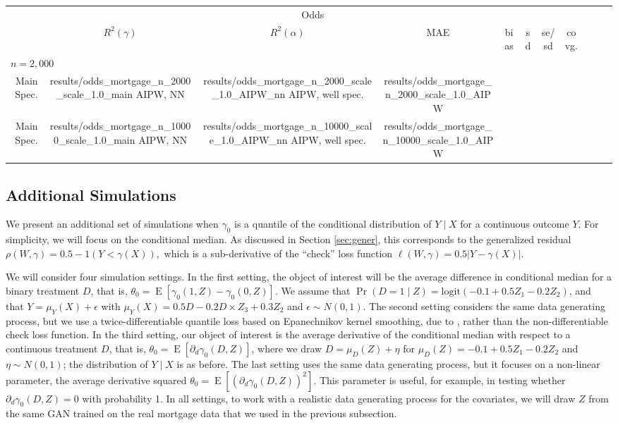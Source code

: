 \documentclass[aos]{imsart}
\makeatletter
\numberwithin{equation}{section}
\theoremstyle{plain}
\theoremstyle{remark}
\DeclareMathOperator{\E}{E}
\newcommand\tableinput[1]{\@@input #1 }
\makeatother
\begin{document}
\begin{table}[]
\begin{tabular}{r*{7}{c}}
    \addlinespace
    \midrule
    & \multicolumn{7}{c}{Odds} \\
    \cmidrule(r){2-8}
    & $R^2(\gamma)$ & $R^2(\alpha)$ & MAE & bias & sd & se/sd & covg. \\ 
    \midrule
    \multicolumn{8}{l}{$n = 2,000$} \\
    Main Spec. & \tableinput{results/odds_mortgage_n_2000_scale_1.0_main}
    AIPW, NN & \tableinput{results/odds_mortgage_n_2000_scale_1.0_AIPW_nn}
    AIPW, well spec. &\tableinput{results/odds_mortgage_n_2000_scale_1.0_AIPW}
    \addlinespace
    \multicolumn{8}{l}{$n = 10,000$} \\
    Main Spec. & \tableinput{results/odds_mortgage_n_10000_scale_1.0_main}
    AIPW, NN & \tableinput{results/odds_mortgage_n_10000_scale_1.0_AIPW_nn}
    AIPW, well spec. &\tableinput{results/odds_mortgage_n_10000_scale_1.0_AIPW}
    \bottomrule
    \end{tabular}
\end{table}

\subsection{Additional Simulations} We present an additional set of simulations when $\gamma_0$ is a quantile of the conditional distribution of $Y \mid X$ for a continuous outcome $Y$. For simplicity, we will focus on the conditional median. As discussed in Section \ref{sec:gener}, this corresponds to the generalized residual $\rho(W, \gamma) = 0.5 - 1(Y < \gamma(X)),$ which is a sub-derivative of the ``check'' loss function $\ell(W, \gamma) = 0.5|Y - \gamma(X)|$.

We will consider four simulation settings. In the first setting, the object of interest will be the average difference in conditional median for a binary treatment $D$, that is, $\theta_0 = \E[\gamma_0(1, Z) - \gamma_0(0, Z)]$. We assume that $\Pr(D = 1 \mid Z) = \mathrm{logit}(-0.1 + 0.5 Z_1 - 0.2 Z_2)$, and that $Y = \mu_Y(X) + \epsilon$ with $\mu_Y(X) = 0.5D - 0.2 D \times Z_3 + 0.3 Z_2$ and $\epsilon \sim N(0, 1)$.  The second setting considers the same data generating process, but we use a twice-differentiable quantile loss based on Epanechnikov kernel smoothing, due to \cite{he2023smoothed}, rather than the non-differentiable check loss function. In the third setting, our object of interest is the average derivative of the conditional median with respect to a continuous treatment $D$, that is, $\theta_0 = \E[\partial_d \gamma_0(D, Z)]$, where we draw $D = \mu_D(Z) + \eta$ for $\mu_D(Z) = -0.1 + 0.5 Z_1 - 0.2 Z_2$ and $\eta \sim N(0, 1)$; the distribution of $Y \mid X$ is as before. The last setting uses the same data generating process, but it focuses on a non-linear parameter, the average derivative squared $\theta_0 = \E[(\partial_d \gamma_0(D, Z))^2]$. This parameter is useful, for example, in testing whether $\partial_d \gamma_0(D, Z) = 0$ with probability 1. In all settings, to work with a realistic data generating process for the covariates, we will draw $Z$ from the same GAN trained on the real mortgage data that we used in the previous subsection.
\end{document}
